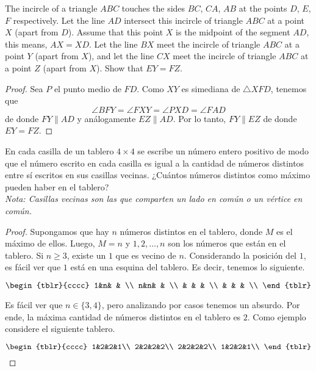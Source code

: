 \begin{probMG}[IberoAmerican 1995/5]
	The incircle of a triangle $ABC$ touches the sides $BC$, $CA$, $AB$ at the points $D$, $E$, $F$ respectively. Let the line $AD$ intersect this incircle of triangle $ABC$ at a point $X$ (apart from $D$). Assume that this point $X$ is the midpoint of the segment $AD$, this means, $AX=XD$. Let the line $BX$ meet the incircle of triangle $ABC$ at a point $Y$ (apart from $X$), and let the line $CX$ meet the incircle of triangle $ABC$ at a point $Z$ (apart from $X$). Show that $EY=FZ$.
\end{probMG}

\begin{proof}
	Sea $P$ el punto medio de $FD$. Como $XY$ es simediana de $\triangle XFD$, tenemos que
	\[\angle BFY=\angle FXY=\angle PXD=\angle FAD\]
	de donde $FY\parallel AD$ y análogamente $EZ\parallel AD$. Por lo tanto, $FY\parallel EZ$ de donde $EY=FZ$.
\end{proof}

\begin{probEB}
	En cada casilla de un tablero $4\times 4$ se escribe un número entero positivo de modo que el número escrito en cada casilla es igual a la cantidad de números distintos entre sí escritos en sus casillas vecinas. ¿Cuántos números distintos como máximo pueden haber en el tablero?\\[4pt]
	\emph{Nota: Casillas vecinas son las que comparten un lado en común o un vértice en común.}
\end{probEB}

\begin{proof}
	Supongamos que hay $n$ números distintos en el tablero, donde $M$ es el máximo de ellos. Luego, $M=n$ y $1,2,\dots,n$ son los números que están en el tablero. Si $n\ge 3$, existe un $1$ que es vecino de $n$. Considerando la posición del $1$, es fácil ver que $1$ está en una esquina del tablero. Es decir, tenemos lo siguiente.

	\[\begin{tblr}{cccc}
		1&n& & \\
		n&n& & \\
		 & & & \\
		 & & & \\
	\end{tblr}\]

	Es fácil ver que $n\in\{3,4\}$, pero analizando por casos tenemos un absurdo. Por ende, la máxima cantidad de números distintos en el tablero es $2$. Como ejemplo considere el siguiente tablero.

	\[\begin{tblr}{cccc}
		1&2&2&1\\
		2&2&2&2\\
		2&2&2&2\\
		1&2&2&1\\
	\end{tblr}\]
\end{proof}


